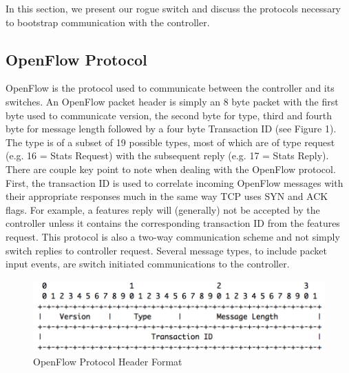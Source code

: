 In this section, we present our rogue switch and discuss the protocols necessary to bootstrap communication with the controller.

\subsection {OpenFlow Protocol}
OpenFlow is the protocol used to communicate between the controller and its switches. An OpenFlow packet header is simply an 8 byte packet with the first byte used to communicate version, the second byte for type, third and fourth byte for message length followed by a four byte Transaction ID (see Figure 1). The type is of a subset of 19 possible types, most of which are of type request (e.g. 16 = Stats Request) with the subsequent reply (e.g. 17 = Stats Reply). There are couple key point to note when dealing with the OpenFlow protocol. First, the transaction ID is used to correlate incoming OpenFlow messages with their appropriate responses much in the same way TCP uses SYN and ACK flags. For example, a features reply will (generally) not be accepted by the controller unless it contains the corresponding transaction ID from the features request. This protocol is also a two-way communication scheme and not simply switch replies to controller request. Several message types, to include packet input events, are switch initiated communications to the controller.  

\begin{figure}
  \includegraphics[width=\linewidth]{openflowProtocol.png}
  \caption{OpenFlow Protocol Header Format \cite{protocol}}
  \label{fig:protocol}
\end{figure}


